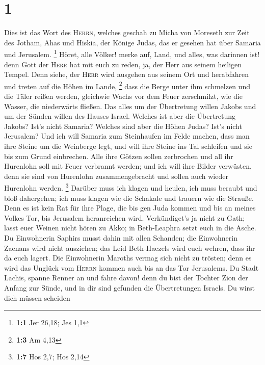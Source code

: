 \hypertarget{section}{%
\section{1}\label{section}}

 Dies ist das Wort des \textsc{Herrn}, welches geschah zu
Micha von Moreseth zur Zeit des Jotham, Ahas und Hiskia, der Könige
Judas, das er gesehen hat über Samaria und Jerusalem. \footnote{\textbf{1:1}
  Jer 26,18; Jes 1,1}  Höret, alle Völker! merke auf,
Land, und alles, was darinnen ist! denn Gott der \textsc{Herr} hat mit
euch zu reden, ja, der Herr aus seinem heiligen Tempel. 
Denn siehe, der \textsc{Herr} wird ausgehen aus seinem Ort und
herabfahren und treten auf die Höhen im Lande, \footnote{\textbf{1:3} Am
  4,13}  dass die Berge unter ihm schmelzen und die Täler
reißen werden, gleichwie Wachs vor dem Feuer zerschmilzt, wie die
Wasser, die niederwärts fließen.  Das alles um der
Übertretung willen Jakobs und um der Sünden willen des Hauses Israel.
Welches ist aber die Übertretung Jakobs? Ist's nicht Samaria? Welches
sind aber die Höhen Judas? Ist's nicht Jerusalem?  Und ich
will Samaria zum Steinhaufen im Felde machen, dass man ihre Steine um
die Weinberge legt, und will ihre Steine ins Tal schleifen und sie bis
zum Grund einbrechen.  Alle ihre Götzen sollen zerbrochen
und all ihr Hurenlohn soll mit Feuer verbrannt werden; und ich will ihre
Bilder verwüsten, denn sie sind von Hurenlohn zusammengebracht und
sollen auch wieder Hurenlohn werden. \footnote{\textbf{1:7} Hos 2,7; Hos
  2,14}  Darüber muss ich klagen und heulen, ich muss
beraubt und bloß dahergehen; ich muss klagen wie die Schakale und
trauern wie die Strauße.  Denn es ist kein Rat für ihre
Plage, die bis gen Juda kommen und bis an meines Volkes Tor, bis
Jerusalem heranreichen wird.  Verkündiget's ja nicht zu
Gath; lasst euer Weinen nicht hören zu Akko; in Beth-Leaphra setzt euch
in die Asche.  Du Einwohnerin Saphirs musst dahin mit
allen Schanden; die Einwohnerin Zaenans wird nicht ausziehen; das Leid
Beth-Haezels wird euch wehren, dass ihr da euch lagert. 
Die Einwohnerin Maroths vermag sich nicht zu trösten; denn es wird das
Unglück vom \textsc{Herrn} kommen auch bis an das Tor Jerusalems.
 Du Stadt Lachis, spanne Renner an und fahre davon! denn
du bist der Tochter Zion der Anfang zur Sünde, und in dir sind gefunden
die Übertretungen Israels.  Du wirst dich müssen scheiden
